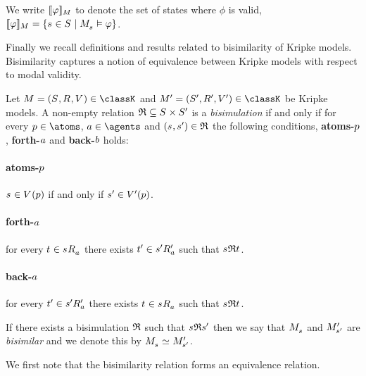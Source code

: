 We write $\interpretation[\model]{\phi}$ to denote the set of states where $\phi$ is valid, $\interpretation[\model]{\phi} = \{\stateS \in \states \mid \pointedModel{\stateS} \entails \phi\}$.

Finally we recall definitions and results related to bisimilarity of Kripke models.
Bisimilarity captures a notion of equivalence between Kripke models with respect to modal validity.

\begin{definition}[Bisimulation]
Let $\modelAndTuple \in \classK$ and $\modelAndTuple[\prime] \in \classK$ be Kripke models.
A non-empty relation $\bisimulation \subseteq \states \times \states[\prime]$ is a {\em bisimulation} if and only if for every $\atomP \in \atoms$, $\agentA \in \agents$ and $(\stateS, \stateS[\prime]) \in \bisimulation$ the following conditions, {\bf atoms-$\atomP$}, {\bf forth-$\agentA$} and {\bf back-$\agentB$} holds:

\paragraph{atoms-$\atomP$}
$\stateS \in \valuation(\atomP)$ if and only if $\stateS[\prime] \in \valuation[\prime](\atomP)$.

\paragraph{forth-$\agentA$}
for every $\stateT \in \successors{\agentA}{\stateS}$ there exists $\stateT[\prime] \in \successors[\prime]{\agentA}{\stateS[\prime]}$ such that $\stateS \bisimulation \stateT$.

\paragraph{back-$\agentA$}
for every $\stateT[\prime] \in \successors[\prime]{\agentA}{\stateS[\prime]}$ there exists $\stateT \in \successors{\agentA}{\stateS}$ such that $\stateS \bisimulation \stateT$.

If there exists a bisimulation $\bisimulation$ such that $\stateS \bisimulation \stateS[\prime]$ then we say that $\pointedModel{\stateS}$ and $\pointedModel[\prime]{\stateS[\prime]}$ are {\em bisimilar} and we denote this by $\pointedModel{\stateS} \bisimilar \pointedModel[\prime]{\stateS[\prime]}$.
\end{definition}

We first note that the bisimilarity relation forms an equivalence relation.

